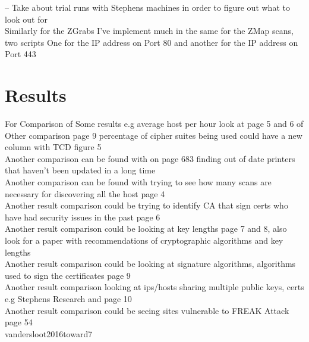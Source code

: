 \documentclass[a4wide,leqno,12pt]{report}
\begin{document}
-- Take about trial runs with Stephens machines in order to figure out what to look out for\\

Similarly for the ZGrabs I’ve implement much in the same for the ZMap scans, two scripts One for the IP address on Port 80 and another for the IP address on Port 443 


\chapter{Results}

For Comparison of Some results e.g average host per hour look at page 5 and 6 of \cite{durumeric2013zmap}\\

Other comparison \cite{durumeric2015search} page 9 percentage of cipher suites being used could have a new column with TCD figure 5\\

Another comparison can be found with \cite{lee2016implementation} on page 683 finding out of date printers that haven't been updated in a long time\\

Another comparison can be found with trying to see how many scans are necessary for discovering all the host \cite{durumeric2013analysis} page 4\\

Another result comparison could be trying to identify CA that sign certs who have had security issues in the past \cite{durumeric2013analysis} page 6\\

Another result comparison could be looking at key lengths \cite{durumeric2013analysis} page 7 and 8, also look for a paper with recommendations of cryptographic algorithms and key lengths\\ 

Another result comparison could be looking at signature algorithms, algorithms used to sign the certificates \cite{durumeric2013analysis} page 9\\

Another result comparison looking at ips/hosts sharing multiple public keys, certs e.g Stephens Research and \cite{durumeric2013analysis} page 10\\

Another result comparison could be seeing sites vulnerable to FREAK Attack \cite{vandersloot2016toward} page 54\\
vandersloot2016toward7
\end{document}
